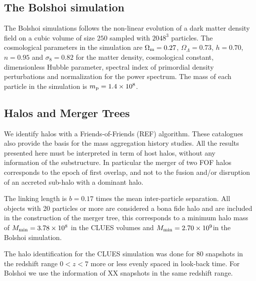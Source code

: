 \documentclass[usenatbib]{latex/mn2e}
\begin{document}
\subsection{The Bolshoi simulation}
\label{subsec:Bolshoi_simulation}

The Bolshoi simulations follows the non-linear evolution of a dark
matter density field on a cubic volume of size $250$\hMpc
sampled with $2048^3$ particles. The cosmological parameters in the
simulation are $\Omega_{\rm m}=0.27$, $\Omega_{\Lambda}=0.73$,
$h=0.70$, $n=0.95$ and $\sigma_{8}=0.82$ for the matter density, 
cosmological constant, dimensionless Hubble parameter, spectral index
of primordial density perturbations and normalization for the power
spectrum. The mass of each particle in the simulation is $m_{\rm
  p}=1.4\times 10^{8}$\hMsun.




\subsection{Halos and Merger Trees}
\label{subsec:halos_merger_trees}

We identify halos with a Friends-of-Friends (REF) algorithm. These 
catalogues also provide the basis for the mass aggregation history studies. 
All the results presented here must be interpreted in term of host halos, 
without any information of the substructure. In particular the merger of 
two FOF halos corresponds to the epoch of first overlap, and not to the 
fusion and/or disruption of an accreted sub-halo with a dominant halo. 


The linking length is $b=0.17$ times the mean inter-particle 
separation. All objects with 20 particles or more are considered a bona 
fide halo and are included in the construction of the merger tree, this 
corresponds to a minimum halo mass of $M_{\rm min}=3.78\times 10^{8}$
\hMsun in the CLUES volumes and $M_{\rm min}=2.70\times 10^{9}$\hMsun in 
the Bolshoi simulation. 


The halo identification for the CLUES simulation was done for 80
snapshots in the redshift range $0<z<7$ more or less evenly spaced in
look-back time. For Bolshoi we use the information of XX snapshots in
the same redshift range.
\end{document}
